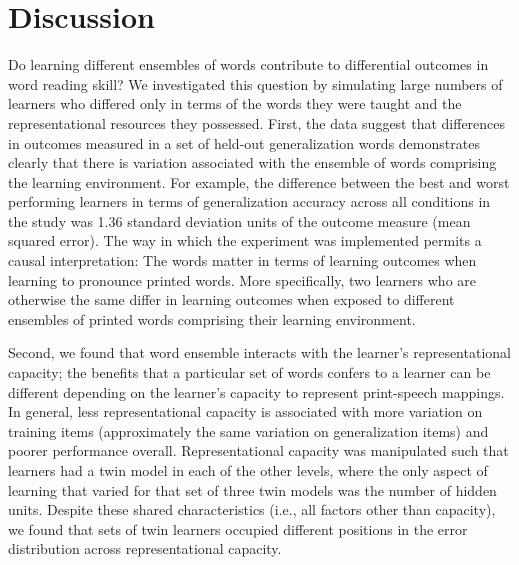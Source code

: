 \documentclass[
  ,man,floatsintext]{apa6}
\begin{document}
\hypertarget{discussion}{%
\section{Discussion}\label{discussion}}

Do learning different ensembles of words contribute to differential outcomes in word reading skill? We investigated this question by simulating large numbers of learners who differed only in terms of the words they were taught and the representational resources they possessed. First, the data suggest that differences in outcomes measured in a set of held-out generalization words demonstrates clearly that there is variation associated with the ensemble of words comprising the learning environment. For example, the difference between the best and worst performing learners in terms of generalization accuracy across all conditions in the study was 1.36 standard deviation units of the outcome measure (mean squared error). The way in which the experiment was implemented permits a causal interpretation: The words matter in terms of learning outcomes when learning to pronounce printed words. More specifically, two learners who are otherwise the same differ in learning outcomes when exposed to different ensembles of printed words comprising their learning environment.

Second, we found that word ensemble interacts with the learner's representational capacity; the benefits that a particular set of words confers to a learner can be different depending on the learner's capacity to represent print-speech mappings. In general, less representational capacity is associated with more variation on training items (approximately the same variation on generalization items) and poorer performance overall. Representational capacity was manipulated such that learners had a twin model in each of the other levels, where the only aspect of learning that varied for that set of three twin models was the number of hidden units. Despite these shared characteristics (i.e., all factors other than capacity), we found that sets of twin learners occupied different positions in the error distribution across representational capacity.
\end{document}
